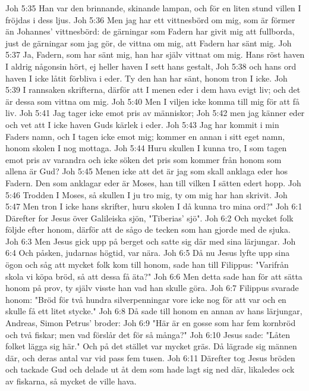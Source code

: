 Joh 5:35  Han var den brinnande, skinande lampan, och för en liten stund villen I fröjdas i dess ljus.
Joh 5:36  Men jag har ett vittnesbörd om mig, som är förmer än Johannes' vittnesbörd: de gärningar som Fadern har givit mig att fullborda, just de gärningar som jag gör, de vittna om mig, att Fadern har sänt mig.
Joh 5:37  Ja, Fadern, som har sänt mig, han har själv vittnat om mig. Hans röst haven I aldrig någonsin hört, ej heller haven I sett hans gestalt,
Joh 5:38  och hans ord haven I icke låtit förbliva i eder. Ty den han har sänt, honom tron I icke.
Joh 5:39  I rannsaken skrifterna, därför att I menen eder i dem hava evigt liv; och det är dessa som vittna om mig.
Joh 5:40  Men I viljen icke komma till mig för att få liv.
Joh 5:41  Jag tager icke emot pris av människor;
Joh 5:42  men jag känner eder och vet att I icke haven Guds kärlek i eder.
Joh 5:43  Jag har kommit i min Faders namn, och I tagen icke emot mig; kommer en annan i sitt eget namn, honom skolen I nog mottaga.
Joh 5:44  Huru skullen I kunna tro, I som tagen emot pris av varandra och icke söken det pris som kommer från honom som allena är Gud?
Joh 5:45  Menen icke att det är jag som skall anklaga eder hos Fadern. Den som anklagar eder är Moses, han till vilken I sätten edert hopp.
Joh 5:46  Trodden I Moses, så skullen I ju tro mig, ty om mig har han skrivit.
Joh 5:47  Men tron I icke hans skrifter, huru skolen I då kunna tro mina ord?"
Joh 6:1  Därefter for Jesus över Galileiska sjön, "Tiberias' sjö".
Joh 6:2  Och mycket folk följde efter honom, därför att de sågo de tecken som han gjorde med de sjuka.
Joh 6:3  Men Jesus gick upp på berget och satte sig där med sina lärjungar.
Joh 6:4  Och påsken, judarnas högtid, var nära.
Joh 6:5  Då nu Jesus lyfte upp sina ögon och såg att mycket folk kom till honom, sade han till Filippus: "Varifrån skola vi köpa bröd, så att dessa få äta?"
Joh 6:6  Men detta sade han för att sätta honom på prov, ty själv visste han vad han skulle göra.
Joh 6:7  Filippus svarade honom: "Bröd för två hundra silverpenningar vore icke nog för att var och en skulle få ett litet stycke."
Joh 6:8  Då sade till honom en annan av hans lärjungar, Andreas, Simon Petrus' broder:
Joh 6:9  "Här är en gosse som har fem kornbröd och två fiskar; men vad förslår det för så många?"
Joh 6:10  Jesus sade: "Låten folket lägga sig här." Och på det stället var mycket gräs. Då lägrade sig männen där, och deras antal var vid pass fem tusen.
Joh 6:11  Därefter tog Jesus bröden och tackade Gud och delade ut åt dem som hade lagt sig ned där, likaledes ock av fiskarna, så mycket de ville hava.
